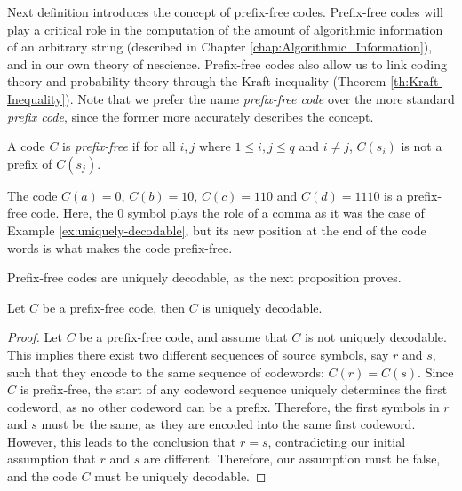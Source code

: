 Next definition introduces the concept of prefix-free codes. Prefix-free codes will play a critical role in the computation of the amount of algorithmic information of an arbitrary string (described in Chapter \ref{chap:Algorithmic_Information}), and in our own theory of nescience. Prefix-free codes also allow us to link coding theory and probability theory through the Kraft inequality (Theorem \ref{th:Kraft-Inequality}). Note that we prefer the name \emph{prefix-free code} over the more standard \emph{prefix code}, since the former more accurately describes the concept.

\begin{definition}
\label{def:Prefix-free-Code}
A code $C$ is \emph{prefix-free} if for all $i, j$ where $1 \leq i, j \leq q$ and $i \neq j$, $C(s_i)$ is not a prefix of $C(s_j)$.
\end{definition}

\begin{example}
\label{ex:prefix-free}
The code $C(a)=0$, $C(b)=10$, $C(c)=110$ and $C(d)=1110$ is a prefix-free code. Here, the $0$ symbol plays the role of a comma as it was the case of Example \ref{ex:uniquely-decodable}, but its new position at the end of the code words is what makes the code prefix-free.
\end{example}

Prefix-free codes are uniquely decodable, as the next proposition proves.

\begin{proposition}
Let $C$ be a prefix-free code, then $C$ is uniquely decodable.
\end{proposition}
\begin{proof}
Let \( C \) be a prefix-free code, and assume that \( C \) is not uniquely decodable. This implies there exist two different sequences of source symbols, say \( r \) and \( s \), such that they encode to the same sequence of codewords: \( C(r) = C(s) \). Since \( C \) is prefix-free, the start of any codeword sequence uniquely determines the first codeword, as no other codeword can be a prefix. Therefore, the first symbols in \( r \) and \( s \) must be the same, as they are encoded into the same first codeword. However, this leads to the conclusion that \( r = s \), contradicting our initial assumption that \( r \) and \( s \) are different. Therefore, our assumption must be false, and the code \( C \) must be uniquely decodable. 
\end{proof}

